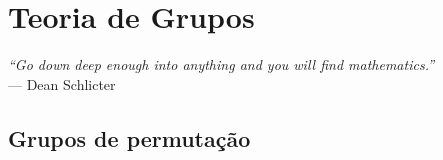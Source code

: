 \chapter[Teoria de Grupos]{Teoria de Grupos}
\label{cap-1}
\chaptermark{}
%
\hfill%
\begin{minipage}{10cm}
\begin{flushright}
\rightskip=0.5cm
\textit{``Go down deep enough into anything and you will find mathematics.''}
\\[0.1cm]
\rightskip=0.5cm
--- Dean Schlicter
\end{flushright}
\end{minipage}

\section{Grupos de permutação}


